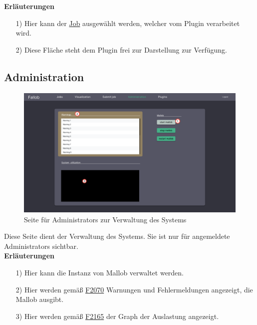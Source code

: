 \textbf{Erläuterungen}
\begin{itemize}
    \item[1)] Hier kann der \hyperref[B:Jobs]{Job} ausgewählt werden, welcher vom \gls{Plugin} verarbeitet wird.
    \item[2)] Diese Fläche steht dem \gls{Plugin} frei zur Darstellung zur Verfügung.
\end{itemize}

\newpage
\subsection{Administration}
\label{pages:admin}
\begin{figure}[H]
    \centering
    \includegraphics[width=\textwidth]{images-interface/v4_interface/admin_page_4.pdf}
    \caption{Seite für \glspl{Administrator} zur Verwaltung des Systems}
    \label{fig:admin-page}
\end{figure}
Diese Seite dient der Verwaltung des Systems. Sie ist nur für angemeldete \glspl{Administrator} sichtbar. \\

\textbf{Erläuterungen}
\begin{itemize}
    \item[1)] Hier kann die Instanz von \gls{Mallob} verwaltet werden.
    \item[2)] Hier werden gemäß \hyperref[FA:Web-Interface:Anzeigen von Warnungen und Fehlermeldungen]{F2070} Warnungen und Fehlermeldungen angezeigt, die \gls{Mallob} ausgibt.
    \item[3)] Hier werden gemäß \hyperref[FA:Web-Interface:Anzeigen von Diagnosedaten]{F2165} der Graph der Auslastung angezeigt.
\end{itemize}

